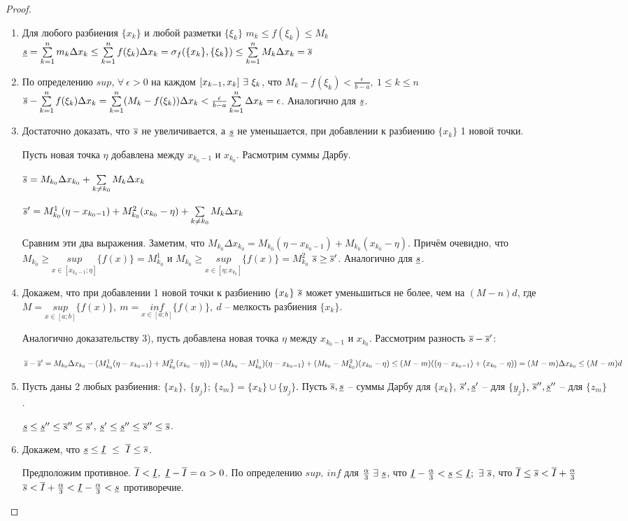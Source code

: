 \begin{proof}
\begin{enumerate}
\item Для любого разбиения $\{x_k\}$ и любой разметки $\{\xi_k\}$ $m_k\leq f(\xi_k)\leq M_k$ \then $\underline{s}=\sum\limits^n_{k=1}m_k\Delta x_k\leq\sum\limits^n_{k=1}f(\xi_k)\Delta x_k=\sigma_f(\{x_k\},\{\xi_k\})\leq\sum\limits^n_{k=1}M_k\Delta x_k=\overline{s}$
\item По определению $sup$, $\forall\ \epsilon>0$ на каждом $[x_{k-1},x_k]\ \exists\ \xi_k$, что $M_k-f(\xi_k)<\frac\epsilon{b-a},\ 1\leq k\leq n$ \then $\overline{s}-\sum\limits^n_{k=1}f(\xi_k)\Delta x_k=\sum\limits^n_{k=1}(M_k-f(\xi_k))\Delta x_k<\frac\epsilon{b-a}\sum\limits^n_{k=1}\Delta x_k=\epsilon$. Аналогично для $\underline{s}$.
\item Достаточно доказать, что $\overline{s}$ не увеличивается, а $\underline{s}$ не уменьшается, при добавлении к разбиению $\{x_k\}$ 1 новой точки.

Пусть новая точка $\eta$ добавлена между $x_{k_0-1}$ и $x_{k_0}$. Расмотрим суммы Дарбу.

$\overline{s}=M_{k_0}\Delta x_{k_0}+\sum\limits_{k\neq k_0}M_k\Delta x_k$

$\overline{s}'=M_{k_0}^1(\eta-x_{k_0-1})+M_{k_0}^2(x_{k_0}-\eta)+\sum\limits_{k\neq k_0}M_k\Delta x_k$

Сравним эти два выражения. Заметим, что $M_{k_0}\Delta x_{k_0}=M_{k_0}(\eta-x_{k_0-1})+M_{k_0}(x_{k_0}-\eta)$. Причём очевидно, что $M_{k_0}\geq\underset{x\in[x_{k_0-1};\eta]}{sup}\{f(x)\}=M_{k_0}^1$ и $M_{k_0}\geq\underset{x\in[\eta;x_{k_0}]}{sup}\{f(x)\}=M_{k_0}^2$ \then $\overline{s}\geq\overline{s}'$. Аналогично для $\underline{s}$.
\item Докажем, что при добавлении 1 новой точки к разбиению $\{x_k\}\ \overline{s}$ может уменьшиться не более, чем на $(M-n)d$, где $M=\underset{x\in[a;b]}{sup}\{f(x)\},\ m=\underset{x\in[a;b]}{inf}\{f(x)\},\ d$ -- мелкость разбиения $\{x_k\}$.

Аналогично доказательству 3), пусть добавлена новая точка $\eta$ между $x_{k_0-1}$ и $x_{k_0}$. Рассмотрим разность $\overline{s}-\overline{s}'$:

$\overline{s}-\overline{s}'=M_{k_0}\Delta x_{k_0}-(M^1_{k_0}(\eta-x_{k_0-1})+M^2_{k_0}(x_{k_0}-\eta))=(M_{k_0}-M^1_{k_0})(\eta-x_{k_0-1})+(M_{k_0}-M^2_{k_0})(x_{k_0}-\eta)\leq(M-m)((\eta-x_{k_0-1})+(x_{k_0}-\eta))=(M-m)\Delta x_{k_0}\leq(M-m)d$
\item Пусть даны 2 любых разбиения: $\{x_k\},\ \{y_j\}$; $\{z_m\}=\{x_k\}\cup\{y_j\}$. Пусть $\overline{s},\underline{s}$ -- суммы Дарбу для $\{x_k\}$, $\overline{s}',\underline{s}'$ -- для $\{y_j\}$, $\overline{s}'',\underline{s}''$ -- для $\{z_m\}$.

$\underline{s}\leq\underline{s}''\leq\overline{s}''\leq\overline{s}'$, $\underline{s}'\leq\underline{s}''\leq\overline{s}''\leq\overline{s}$.
\item Докажем, что $\ns\leq\nis\ \leq\ \vis\leq\vs$.

Предположим противное. $\vis<\nis,\ \nis-\vis=\alpha>0$. По определению $sup,\ inf$ для $\frac\alpha3\ \exists\ \underline{s}$, что $\nis-\frac\alpha3<\ns\leq\nis;\ \exists\ \vs$, что $\overline{I}\leq\overline{s}<\overline{I}+\frac\alpha3$ \then $\overline{s}<\overline{I}+\frac\alpha3<\underline{I}-\frac\alpha3<\underline{s}$ \then противоречие.
\end{enumerate}
\end{proof}
